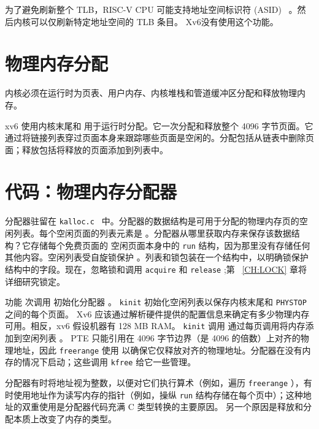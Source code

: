 \documentclass[UTF8]{article}
\begin{document}
为了避免刷新整个 TLB，RISC-V CPU 可能支持地址空间标识符 (ASID)~    \cite{riscv:priv}    。然后内核可以仅刷新特定地址空间的 TLB 条目。 Xv6没有使用这个功能。  

   \section{物理内存分配  }     

内核必须在运行时为页表、用户内存、内核堆栈和管道缓冲区分配和释放物理内存。  

xv6 使用内核末尾和
        用于运行时分配。它一次分配和释放整个 4096 字节页面。它通过将链接列表穿过页面本身来跟踪哪些页面是空闲的。分配包括从链表中删除页面；释放包括将释放的页面添加到列表中。
    \section{代码：物理内存分配器  }     

分配器驻留在  {    \tt    kalloc.c   }         中。分配器的数据结构是可用于分配的物理内存页的空闲列表。每个空闲页面的列表元素是
        。分配器从哪里获取内存来保存该数据结构？它存储每个免费页面的
 空闲页面本身中的    \lstinline{run}    结构，因为那里没有存储任何其他内容。空闲列表受自旋锁保护
        。列表和锁包装在一个结构中，以明确锁保护结构中的字段。现在，忽略锁和调用
    \lstinline{acquire}    和
    \lstinline{release}   ;第~    \ref{CH:LOCK}    章将详细研究锁定。  

功能
        次调用
        初始化分配器
        。
    \lstinline{kinit}    初始化空闲列表以保存内核末尾和  {    \tt    PHYSTOP   }  之间的每个页面。 Xv6 应该通过解析硬件提供的配置信息来确定有多少物理内存可用。相反，xv6 假设机器有 128 MB RAM。
    \lstinline{kinit}    调用
        通过每页调用将内存添加到空闲列表
        。 PTE 只能引用在 4096 字节边界（是 4096 的倍数）上对齐的物理地址，因此
    \lstinline{freerange}    使用
        以确保它仅释放对齐的物理地址。分配器在没有内存的情况下启动；这些调用
    \lstinline{kfree}    给它一些管理。  

分配器有时将地址视为整数，以便对它们执行算术（例如，遍历
    \lstinline{freerange}    ），有时使用地址作为读写内存的指针（例如，操纵
    \lstinline{run}    结构存储在每个页中）；这种地址的双重使用是分配器代码充满 C 类型转换的主要原因。
        另一个原因是释放和分配本质上改变了内存的类型。  
\end{document}
